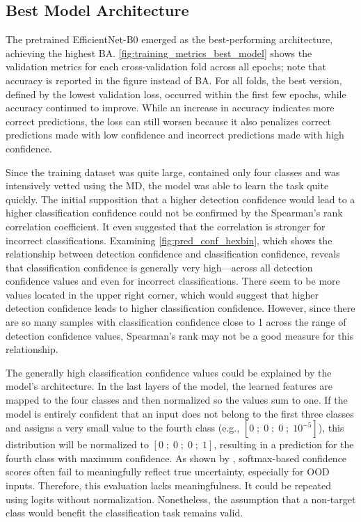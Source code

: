 \subsection{Best Model Architecture}
The pretrained EfficientNet-B0 emerged as the best-performing architecture, achieving the highest \ac{BA}.
\autoref{fig:training_metrics_best_model} shows the validation metrics for each cross-validation fold across all epochs; note that accuracy is reported in the figure instead of \ac{BA}.
For all folds, the best version, defined by the lowest validation loss, occurred within the first few epochs, while accuracy continued to improve.
While an increase in accuracy indicates more correct predictions, the loss can still worsen because it also penalizes correct predictions made with low confidence and incorrect predictions made with high confidence.

Since the training dataset was quite large, contained only four classes and was intensively vetted using the \ac{MD}, the model was able to learn the task quite quickly.
The initial supposition that a higher detection confidence would lead to a higher classification confidence could not be confirmed by the Spearman's rank correlation coefficient.
It even suggested that the correlation is stronger for incorrect classifications.
Examining \autoref{fig:pred_conf_hexbin}, which shows the relationship between detection confidence and classification confidence, reveals that classification confidence is generally very high---across all detection confidence values and even for incorrect classifications.
There seem to be more values located in the upper right corner, which would suggest that higher detection confidence leads to higher classification confidence.
However, since there are so many samples with classification confidence close to 1 across the range of detection confidence values, Spearman's rank may not be a good measure for this relationship.

The generally high classification confidence values could be explained by the model's architecture.
In the last layers of the model, the learned features are mapped to the four classes and then normalized so the values sum to one.
If the model is entirely confident that an input does not belong to the first three classes and assigns a very small value to the fourth class (e.g., \([0\;;\;0\;;\;0\;;\;10^{-5}]\)), this distribution will be normalized to \([0\;;\;0\;;\;0\;;\;1]\), resulting in a prediction for the fourth class with maximum confidence.
As shown by \textcite{hendrycksBaselineDetectingMisclassified2018}, softmax-based confidence scores often fail to meaningfully reflect true uncertainty, especially for \ac{OOD} inputs.
Therefore, this evaluation lacks meaningfulness.
It could be repeated using logits without normalization.
Nonetheless, the assumption that a non-target class would benefit the classification task remains valid.

